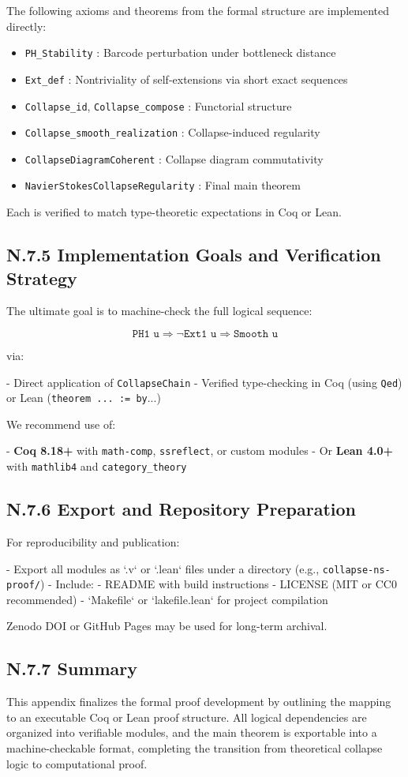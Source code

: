 \documentclass[11pt]{article}
\begin{document}
The following axioms and theorems from the formal structure are implemented directly:

\begin{itemize}
  \item \texttt{PH\_Stability} : Barcode perturbation under bottleneck distance
  \item \texttt{Ext\_def} : Nontriviality of self-extensions via short exact sequences
  \item \texttt{Collapse\_id}, \texttt{Collapse\_compose} : Functorial structure
  \item \texttt{Collapse\_smooth\_realization} : Collapse-induced regularity
  \item \texttt{CollapseDiagramCoherent} : Collapse diagram commutativity
  \item \texttt{NavierStokesCollapseRegularity} : Final main theorem
\end{itemize}

Each is verified to match type-theoretic expectations in Coq or Lean.

\subsection*{N.7.5 Implementation Goals and Verification Strategy}

The ultimate goal is to machine-check the full logical sequence:

\[
\texttt{PH1 u} \Rightarrow \neg \texttt{Ext1 u} \Rightarrow \texttt{Smooth u}
\]

via:

- Direct application of \texttt{CollapseChain}
- Verified type-checking in Coq (using \texttt{Qed}) or Lean (\texttt{theorem ... := by}...)

We recommend use of:

- \textbf{Coq 8.18+} with \texttt{math-comp}, \texttt{ssreflect}, or custom modules
- Or \textbf{Lean 4.0+} with \texttt{mathlib4} and \texttt{category\_theory}

\subsection*{N.7.6 Export and Repository Preparation}

For reproducibility and publication:

- Export all modules as `.v` or `.lean` files under a directory (e.g., \texttt{collapse-ns-proof/})
- Include:
  - README with build instructions
  - LICENSE (MIT or CC0 recommended)
  - `Makefile` or `lakefile.lean` for project compilation

Zenodo DOI or GitHub Pages may be used for long-term archival.

\subsection*{N.7.7 Summary}

This appendix finalizes the formal proof development by outlining the mapping to an executable Coq or Lean proof structure.  
All logical dependencies are organized into verifiable modules, and the main theorem is exportable into  
a machine-checkable format, completing the transition from theoretical collapse logic to computational proof.
\end{document}
